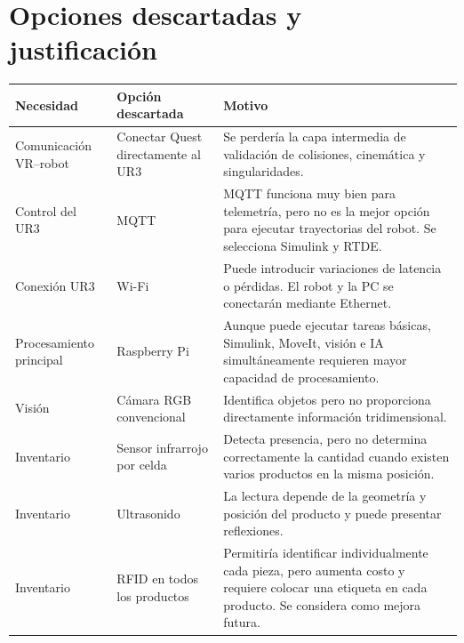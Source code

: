 \documentclass[12pt,letterpaper]{article}
\begin{document}
\section{Opciones descartadas y justificación}

\begin{table}[H]
\centering
\footnotesize
\renewcommand{\arraystretch}{1.4}

\begin{tabularx}{\textwidth}{
    >{\raggedright\arraybackslash}p{3.6cm}
    >{\raggedright\arraybackslash}p{3cm}
    X
}

\toprule
\textbf{Necesidad} &
\textbf{Opción descartada} &
\textbf{Motivo} \\
\midrule

Comunicación VR--robot &
Conectar Quest directamente al UR3 &
Se perdería la capa intermedia de validación de colisiones, cinemática y singularidades. \\

Control del UR3 &
MQTT &
MQTT funciona muy bien para telemetría, pero no es la mejor opción para ejecutar trayectorias del robot. Se selecciona Simulink y RTDE. \\

Conexión UR3 &
Wi-Fi &
Puede introducir variaciones de latencia o pérdidas. El robot y la PC se conectarán mediante Ethernet. \\

Procesamiento principal &
Raspberry Pi &
Aunque puede ejecutar tareas básicas, Simulink, MoveIt, visión e IA simultáneamente requieren mayor capacidad de procesamiento. \\

Visión &
Cámara RGB convencional &
Identifica objetos pero no proporciona directamente información tridimensional. \\

Inventario &
Sensor infrarrojo por celda &
Detecta presencia, pero no determina correctamente la cantidad cuando existen varios productos en la misma posición. \\

Inventario &
Ultrasonido &
La lectura depende de la geometría y posición del producto y puede presentar reflexiones. \\

Inventario &
RFID en todos los productos &
Permitiría identificar individualmente cada pieza, pero aumenta costo y requiere colocar una etiqueta en cada producto. Se considera como mejora futura. \\


\end{tabularx}
\end{table}
\end{document}
